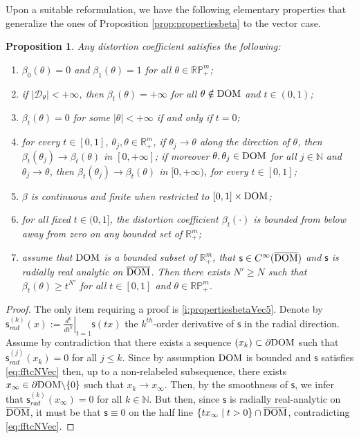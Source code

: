 \documentclass[11pt,a4paper]{article}
\theoremstyle{plain}
\newtheorem{proposition}[theorem]{Proposition}
\theoremstyle{definition}
\theoremstyle{remark}
\numberwithin{equation}{section}
\newcommand{\R}{\mathbb{R}} %
\newcommand{\RP}{\mathbb{RP}} %
\newcommand{\N}{\mathbb{N}} %
\newcommand{\DOM}{{\rm{DOM}}}
\newcommand{\cD}{\mathcal{D}}
\newcommand{\sfs}{\mathsf{s}}
\begin{document}
Upon a suitable reformulation, we have the following elementary properties that generalize the ones of Proposition \ref{prop:propertiesbeta} to the vector case.

\begin{proposition}\label{prop:propertiesbetaVec}
Any distortion coefficient satisfies the following:
\begin{enumerate}[label=(\roman*)]
\item \label{i:propertiesbetaVec-1}  $\beta_0(\theta)=0$ and $\beta_1(\theta) = 1$ for all $\theta \in \RP^m_+$;
\item \label{i:propertiesbetaVec0}  if $|\cD_\theta|<+\infty$, then $\beta_t(\theta) = +\infty$ for all $\theta \notin\DOM$ and $t\in (0,1)$;
\item \label{i:propertiesbetaVec1} $\beta_{t}(\theta)=0$ for some $|\theta| < +\infty$ if and only if $t=0$;
\item \label{i:propertiesbetaVec2} for every $t\in [0,1]$,  $\theta_{j}, \theta\in  \R^m_+$,  if $\theta_{j}\to \theta$ along the direction of $\theta$, then $\beta_{t}(\theta_{j})\to \beta_{t}(\theta)$ in $[0,+\infty]$;  if moreover $\theta, \theta_j\in \DOM$ for all $j\in \N$ and $\theta_{j}\to \theta$, then $\beta_{t}(\theta_{j})\to \beta_{t}(\theta)$ in $[0,+\infty)$, for every $t\in [0,1]$;
\item \label{i:propertiesbetaVec3} $\beta$ is  continuous and finite when restricted to $[0,1]\times \DOM $;
\item \label{i:propertiesbetaVec4} for all fixed $t\in (0,1]$,  the distortion coefficient $\beta_t(\cdot)$ is bounded from below away from zero on any bounded set of $\R^m_+$;
\item \label{i:propertiesbetaVec5} assume that $\DOM$ is a bounded subset of $\R^m_+$, that $\sfs \in C^\infty(\overline{\DOM})$ and $\sfs$ is radially real analytic on $\overline{\DOM}$. Then there exists $N'\geq N$ such that $\beta_t(\theta) \geq t^{N'}$ for all $t\in [0,1]$ and $\theta \in\RP^{m}_+$.
\end{enumerate}
\end{proposition}


\begin{proof}
The only item requiring a proof is \ref{i:propertiesbetaVec5}. Denote by $\sfs^{(k)}_{rad}(x):=\left.\frac{d^k}{dt^k}\right|_{t=1}\sfs(tx)$ the $k^{th}$-order derivative of $\sfs$ in the radial direction.  Assume by contradiction that there exists a sequence $(x_k)\subset \partial \DOM$ such that $\sfs^{(j)}_{rad}(x_k)=0$ for all $j\leq k$. Since by assumption $\DOM$ is bounded and $\sfs$ satisfies  \eqref{eq:fftcNVec} then, up to a non-relabeled subsequence, there exists $x_\infty\in \partial \DOM {\setminus\{0\}}$ such that $x_k\to x_\infty$.  Then, by the smoothness of $\sfs$, we infer that $\sfs^{(k)}_{rad}(x_\infty)=0$ for all $k\in\N$. But then, since $\sfs$ is radially real-analytic on $\overline{\DOM}$, it must be that $\sfs\equiv 0$ on the half line $\{t x_\infty \mid t>0\}\cap \overline\DOM$, contradicting \eqref{eq:fftcNVec}.
\end{proof}
\end{document}
